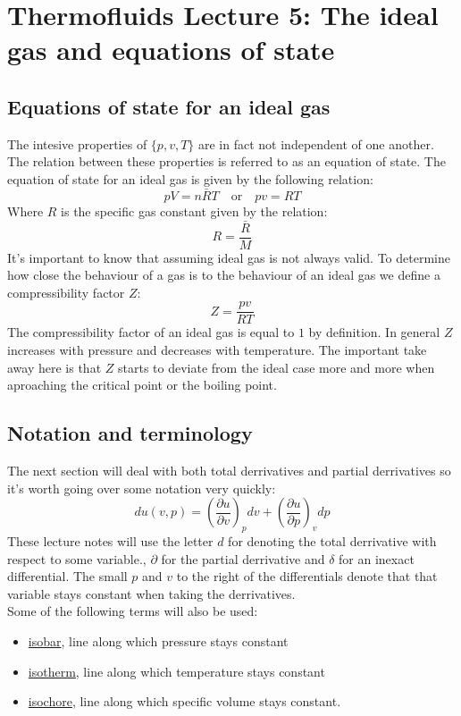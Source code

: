 \documentclass[11pt, a4paper]{article}
\begin{document}
\setcounter{equation}{0}
\setcounter{section}{4}

\section{Thermofluids Lecture 5: The ideal gas and equations of state}


\subsection{Equations of state for an ideal gas}
The intesive properties of $\{p, v, T \}$ are in fact not independent of one another. The relation between these properties is referred to as an equation of state. The equation of state for an ideal gas is given by the following relation:
\begin{equation}
  pV = n \bar{R}T \quad \text{or} \quad pv = RT
\end{equation}
Where $R$ is the specific gas constant given by the relation:
\begin{equation}
  R = \frac{\bar{R}}{M}
\end{equation}
It's important to know that assuming ideal gas is not always valid. To determine how close the behaviour of a gas is to the behaviour of an ideal gas we define a compressibility factor $Z$:
\begin{equation}
  Z = \frac{pv}{RT}
\end{equation}
The compressibility factor of an ideal gas is equal to $1$ by definition. In general $Z$ increases with pressure and decreases with temperature. The important take away here is that $Z$ starts to deviate from the ideal case more and more when aproaching the critical point or the boiling point.


\subsection{Notation and terminology}
The next section will deal with both total derrivatives and partial derrivatives so it's worth going over some notation very quickly:
\begin{equation}
  du(v, p) = \left( \frac{\partial u}{\partial v} \right)_p dv + \left( \frac{\partial u}{\partial p} \right)_v dp
\end{equation}
These lecture notes will use the letter $d$ for denoting the total derrivative with respect to some variable., $\partial$ for the partial derrivative and $\delta$ for an inexact differential. The small $p$ and $v$ to the right of the differentials denote that that variable stays constant when taking the derrivatives.\\
Some of the following terms will also be used:
\begin{itemize}
  \item \underline{isobar}, line along which pressure stays constant
  \item \underline{isotherm}, line along which temperature stays constant
  \item \underline{isochore}, line along which specific volume stays constant.
\end{itemize}
\end{document}
